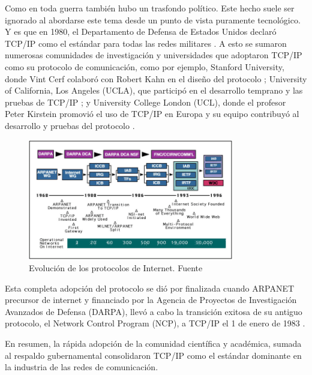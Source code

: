 Como en toda guerra también hubo un trasfondo político. Este hecho suele ser ignorado al abordarse este tema desde un punto de vista puramente tecnológico.
Y es que en 1980, el Departamento de Defensa de Estados Unidos declaró TCP/IP como el estándar para todas las redes militares \cite{leinerBriefHistoryInternet1999}.
A esto se sumaron numerosas comunidades de investigación y universidades que adoptaron TCP/IP como su protocolo de comunicación, como por ejemplo, Stanford University, donde Vint Cerf colaboró con Robert Kahn en el diseño del protocolo \cite{leinerBriefHistoryInternet1999}; University of California, Los Angeles (UCLA), que participó en el desarrollo temprano y las pruebas de TCP/IP \cite{leinerBriefHistoryInternet1999}; y University College London (UCL), donde el profesor Peter Kirstein promovió el uso de TCP/IP en Europa y su equipo contribuyó al desarrollo y pruebas del protocolo \cite{moriPeterKirsteinObituary2020}.

\begin{figure}[H]
      \centering
      \includegraphics[width=0.8\textwidth]{images/TimelineOfTheInternetProtocols.png}
      \caption[Evolución de los protocolos de Internet]{Evolución de los protocolos de Internet. Fuente \cite{leinerBriefHistoryInternet1999}}
\end{figure}

Esta completa adopción del protocolo se dió por finalizada cuando ARPANET precursor de
internet y financiado por la Agencia de Proyectos de Investigación Avanzados de Defensa
(DARPA), llevó a cabo la transición exitosa de su antiguo protocolo, el Network Control Program
(NCP), a TCP/IP el 1 de enero de 1983 \cite{leinerBriefHistoryInternet1999}.

En resumen, la rápida adopción de la comunidad científica y académica, sumada al respaldo gubernamental consolidaron TCP/IP como el estándar dominante en la industria de las redes de comunicación.

